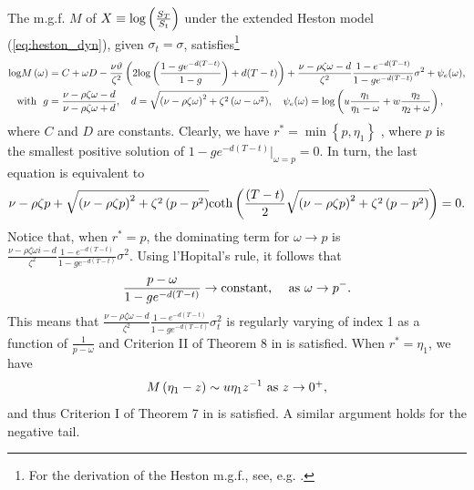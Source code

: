 \documentclass[11pt]{article}
\numberwithin{equation}{section}
\numberwithin{theorem}{section}
\begin{document}
The m.g.f. $M$ of $X\equiv\hbox{log}\left(\frac{S_T}{S_t}\right)$ under the extended Heston model (\ref{eq:heston_dyn}), given $\sigma_t=\sigma$, satisfies\footnote{For the derivation of the Heston m.g.f.,  see, e.g.  \citet{BanoRollin2009}.}
\begin{align*}
{\log}M\left(\omega\right) & =  C+\omega D-\frac{\nu\vartheta}{\zeta^{2}}\left(2{\log}\left(\frac{1-ge^{-d\left(T-t\right)}}{1-g}\right)+d(T-t)\right)+\frac{\nu-\rho\zeta\omega -d}{\zeta^{2}}\frac{1-e^{-d\left(T-t\right)}}{1-ge^{-d\left(T-t\right)}}\sigma^{2}+\psi_e(\omega),\\
\text{ with} ~~g & =  \frac{\nu-\rho\zeta\omega -d}{\nu-\rho\zeta\omega +d}, \quad
d  = \mbox{\ensuremath{\sqrt{\left(\nu-\rho\zeta\omega \right)^{2}+\zeta^{2}\left(\omega -\omega^{2}\right)}}}, \quad
\psi_e(\omega)  =  {\log}\left(u\frac{\eta_{1}}{\eta_{1}-\omega}+w\frac{\eta_{2}}{\eta_{2}+\omega}\right),
\end{align*}
where $C$ and $D$ are constants. Clearly, we have $r^{*}=\min\left\{ p,\eta_{1}\right\}$ , where $p$ is the smallest positive solution of $1-ge^{-d\left(T-t\right)}\vert _{\omega=p}=0.$
In turn, the last equation is equivalent to 
\[
\nu-\rho\zeta p+\mbox{\ensuremath{\sqrt{\left(\nu-\rho\zeta p\right)^{2}+\zeta^{2}\left(p-p^{2}\right)}}}\mbox{coth}\left(\frac{\left(T-t\right)}{2}\mbox{\ensuremath{\sqrt{\left(\nu-\rho\zeta p\right)^{2}+\zeta^{2}\left(p-p^{2}\right)}}}\right)=0.
\]
Notice that, when $r^{*}=p$, the dominating term for $\omega\rightarrow p$
is $\frac{\nu-\rho\zeta\omega i-d}{\zeta^{2}}\frac{1-e^{-d\left(T-t\right)}}{1-ge^{-d\left(T-t\right)}}\sigma^{2}$.
Using l'Hopital's rule, it follows that 
\[
\frac{p-\omega}{1-ge^{-d\left(T-t\right)}}\rightarrow \text{constant, \quad as}~ \omega\rightarrow p^{-}.
\]
This means that $\frac{\nu-\rho\zeta\omega-d}{\zeta^{2}}\frac{1-e^{-d\left(T-t\right)}}{1-ge^{-d\left(T-t\right)}}\sigma_{t}^{2}$
is regularly varying of index 1 as a function of $\frac{1}{p-\omega}$
and Criterion II of  Theorem 8 in  \citet{Benaim2008} is satisfied. When
$r^{*}=\eta_{1}$, we have 
\[
M\left(\eta_{1}-z\right)\sim u\eta_{1}z^{-1}\mbox{ as \ensuremath{z\rightarrow0^{+}}},
\]
and thus Criterion I of   Theorem 7  in  \citet{Benaim2008}  is satisfied.
A similar argument holds for the negative tail.
\end{document}
